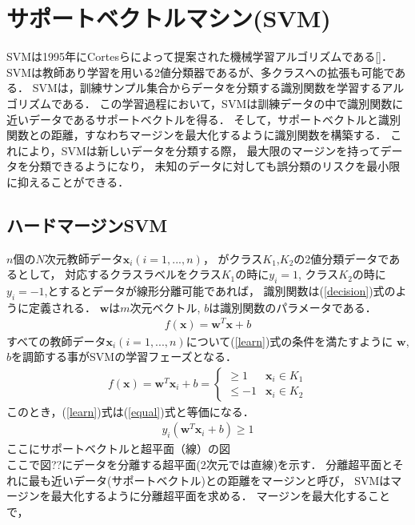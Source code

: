 \section{サポートベクトルマシン(SVM)}
SVMは1995年にCortesらによって提案された機械学習アルゴリズムである[\cite{svm}]．
SVMは教師あり学習を用いる2値分類器であるが、多クラスへの拡張も可能である．
SVMは，訓練サンプル集合からデータを分類する識別関数を学習するアルゴリズムである．
この学習過程において，SVMは訓練データの中で識別関数に近いデータであるサポートベクトルを得る．
そして，サポートベクトルと識別関数との距離，すなわちマージンを最大化するように識別関数を構築する．
これにより，SVMは新しいデータを分類する際，
最大限のマージンを持ってデータを分類できるようになり，
未知のデータに対しても誤分類のリスクを最小限に抑えることができる．
\subsection{ハードマージンSVM}
$n$個の$N$次元教師データ$\boldsymbol{x}_i(i=1,...,n)$，
がクラス$K_1$,$K_2$の2値分類データであるとして，
対応するクラスラベルをクラス$K_1$の時に$y_i= 1$,
クラス$K_2$の時に$y_i= -1$,とするとデータが線形分離可能であれば，
識別関数は(\ref{decision})式のように定義される．
 $\boldsymbol{w}$は$m$次元ベクトル, $b$は識別関数のパラメータである．
\begin{align}
    \label{decision}
f(\boldsymbol{x}) = \boldsymbol{w}^T \boldsymbol{x} + b
\end{align}
すべての教師データ$\boldsymbol{x}_i(i=1,...,n)$について(\ref{learn})式の条件を満たすように
$\boldsymbol{w}$, $b$を調節する事がSVMの学習フェーズとなる．
\begin{align}
    \label{learn}
    f(\boldsymbol{x}) = \boldsymbol{w}^T \boldsymbol{x}_i + b =
    \begin{cases}
        \geq 1&  \boldsymbol{x}_i \in K_1 \\
        \leq  -1& \boldsymbol{x}_i \in K_2
    \end{cases}
\end{align}
このとき，(\ref{learn})式は(\ref{equal})式と等価になる．
\begin{align}
    \label{equal}
    y_i(\boldsymbol{w}^T \boldsymbol{x}_i + b) \geq 1
\end{align}
ここにサポートベクトルと超平面（線）の図\\
ここで図??にデータを分離する超平面(2次元では直線)を示す．
分離超平面とそれに最も近いデータ(サポートベクトル)との距離をマージンと呼び，
SVMはマージンを最大化するように分離超平面を求める．
マージンを最大化することで，
